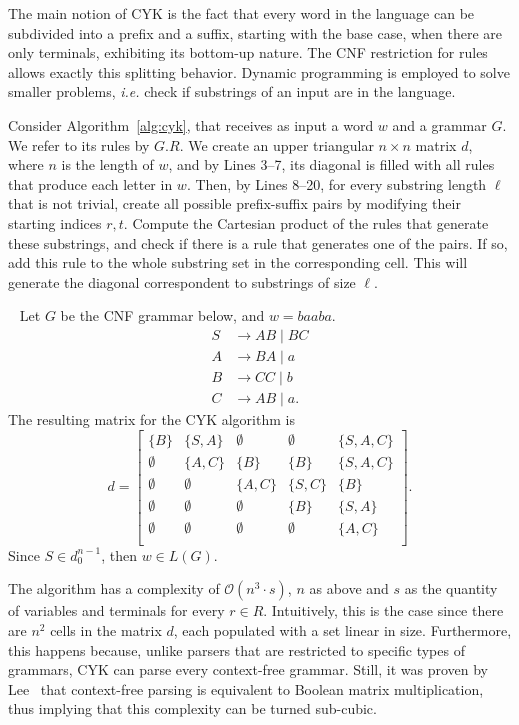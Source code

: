 \documentclass[12pt]{article}
\begin{document}
The main notion of CYK is the fact that every word in the language can be subdivided into a prefix and a suffix, starting with the base case, when there are only terminals, exhibiting its bottom-up nature. The CNF restriction for rules allows exactly this splitting behavior. Dynamic programming is employed to solve smaller problems, \emph{i.e.} check if substrings of an input are in the language.

Consider Algorithm~\ref{alg:cyk}, that receives as input a word $w$ and a grammar $G$. We refer to its rules by $G.R$. We create an upper triangular $n \times n$ matrix $d$, where $n$ is the length of $w$, and by Lines 3--7, its diagonal is filled with all rules that produce each letter in $w$. Then, by Lines 8--20, for every substring length $\ell$ that is not trivial, create all possible prefix-suffix pairs by modifying their starting indices $r, t$. Compute the Cartesian product of the rules that generate these substrings, and check if there is a rule that generates one of the pairs. If so, add this rule to the whole substring set in the corresponding cell. This will generate the diagonal correspondent to substrings of size $\ell$.

\emph{~\cite[Example 7.34.]{}} Let $G$ be the CNF grammar below, and $w = baaba$.
\begin{align*}
    S &\rightarrow AB \mid BC \\
    A &\rightarrow BA \mid a \\
    B &\rightarrow CC \mid b \\
    C &\rightarrow AB \mid a.
\end{align*}
The resulting matrix for the CYK algorithm is
\[
    d = \begin{bmatrix}
        \{B\}     & \{S, A\}  & \emptyset & \emptyset & \{S, A, C\} \\
        \emptyset & \{A, C\}  & \{B\}     & \{B\}     & \{S, A, C\} \\
        \emptyset & \emptyset & \{A, C\}  & \{S, C\}  & \{B\}       \\
        \emptyset & \emptyset & \emptyset & \{B\}     & \{S, A\}    \\
        \emptyset & \emptyset & \emptyset & \emptyset & \{A, C\}    \\
    \end{bmatrix}.
\]
Since $S \in d_{0}^{n - 1}$, then $w \in L(G)$.

The algorithm has a complexity of $\mathcal{O}(n^{3} \cdot s)$, $n$ as above and $s$ as the quantity of variables and terminals for every $r \in R$. Intuitively, this is the case since there are $n^{2}$ cells in the matrix $d$, each populated with a set linear in size. Furthermore, this happens because, unlike parsers that are restricted to specific types of grammars, CYK can parse every context-free grammar. Still, it was proven by Lee~\cite{} that context-free parsing is equivalent to Boolean matrix multiplication, thus implying that this complexity can be turned sub-cubic.
\end{document}

